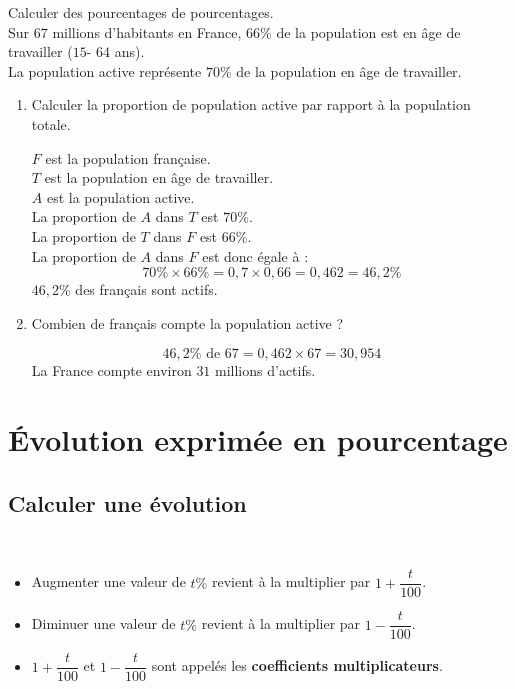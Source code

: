 \begin{Méthode}Calculer des pourcentages de pourcentages. \\
Sur $67$ millions d'habitants en France, $66 \%$ de la population est en âge de travailler ($15$- $64$ ans).\\
La population active représente $70 \%$ de la population en âge de travailler.
\begin{enumerate}
\item Calculer la proportion de population active par rapport à la population totale.

$F$ est la population française.\\
$T$ est la population en âge de travailler.\\ $A$ est la population active.\\
La proportion de $A$ dans $T$ est $70\%$.\\
La proportion de $T$ dans $F$ est $66\%$.\\
La proportion de $A$ dans $F$ est donc égale à : $$70 \% \times 66 \% = 0,7 \times 0,66 = 0,462 = 46,2 \%$$
$46,2 \%$ des français sont actifs.

\item Combien de français compte la population active ?

$$46,2 \% \text{ de } 67 = 0,462 \times 67 = 30,954$$
La France compte environ $31$ millions d'actifs.
\end{enumerate}
\end{Méthode}

\newpage

\section{Évolution exprimée en pourcentage}

\subsection{Calculer une évolution}

\begin{Propriétés} $ $\\
\begin{itemize}[label=\textcolor{Couleur2}{$\bullet$}]
\item Augmenter une valeur de $t\%$ revient à la multiplier par $1+\dfrac{t}{100}$.
\item Diminuer une valeur de $t\%$ revient à la multiplier par $1-\dfrac{t}{100}$.
\item $1+\dfrac{t}{100}$ et $1-\dfrac{t}{100}$ sont appelés les {\bf{coefficients multiplicateurs}}. 
\end{itemize}
\end{Propriétés}

